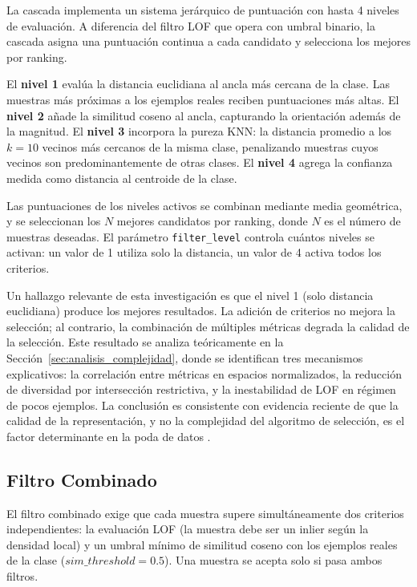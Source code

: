 La cascada implementa un sistema jerárquico de puntuación con hasta 4 niveles de evaluación. A diferencia del filtro LOF que opera con umbral binario, la cascada asigna una puntuación continua a cada candidato y selecciona los mejores por ranking.

El \textbf{nivel 1} evalúa la distancia euclidiana al ancla más cercana de la clase. Las muestras más próximas a los ejemplos reales reciben puntuaciones más altas. El \textbf{nivel 2} añade la similitud coseno al ancla, capturando la orientación además de la magnitud. El \textbf{nivel 3} incorpora la pureza KNN: la distancia promedio a los $k=10$ vecinos más cercanos de la misma clase, penalizando muestras cuyos vecinos son predominantemente de otras clases. El \textbf{nivel 4} agrega la confianza medida como distancia al centroide de la clase.

Las puntuaciones de los niveles activos se combinan mediante media geométrica, y se seleccionan los $N$ mejores candidatos por ranking, donde $N$ es el número de muestras deseadas. El parámetro \texttt{filter\_level} controla cuántos niveles se activan: un valor de 1 utiliza solo la distancia, un valor de 4 activa todos los criterios.

Un hallazgo relevante de esta investigación es que el nivel 1 (solo distancia euclidiana) produce los mejores resultados. La adición de criterios no mejora la selección; al contrario, la combinación de múltiples métricas degrada la calidad de la selección. Este resultado se analiza teóricamente en la Sección~\ref{sec:analisis_complejidad}, donde se identifican tres mecanismos explicativos: la correlación entre métricas en espacios normalizados, la reducción de diversidad por intersección restrictiva, y la inestabilidad de LOF en régimen de pocos ejemplos. La conclusión es consistente con evidencia reciente de que la calidad de la representación, y no la complejidad del algoritmo de selección, es el factor determinante en la poda de datos \cite{du2025disentangling}.

\subsection{Filtro Combinado}
\label{subsec:filtro_combinado}

El filtro combinado exige que cada muestra supere simultáneamente dos criterios independientes: la evaluación LOF (la muestra debe ser un inlier según la densidad local) y un umbral mínimo de similitud coseno con los ejemplos reales de la clase ($sim\_threshold=0.5$). Una muestra se acepta solo si pasa ambos filtros.

